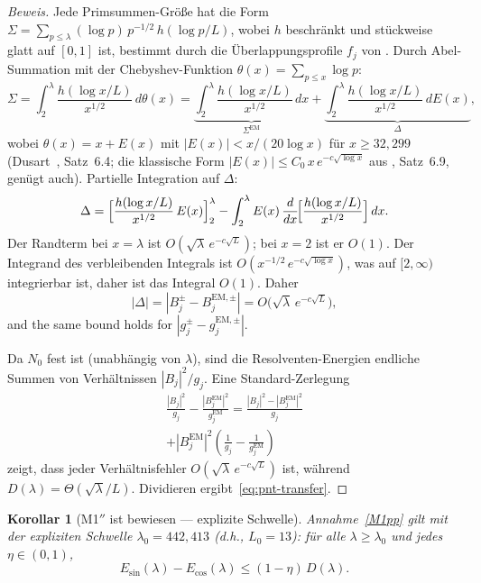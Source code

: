 \documentclass[12pt,a4paper]{article}
\newtheorem{corollary}[theorem]{Korollar}
\theoremstyle{definition}
\theoremstyle{remark}
\begin{document}
\begin{proof}[Beweis]
Jede Primsummen-Größe hat die Form $\Sigma = \sum_{p \leq \lambda} (\log p)\,p^{-1/2}\,h(\log p/L)$, wobei $h$ beschränkt und stückweise glatt auf $[0,1]$ ist, bestimmt durch die Überlappungsprofile $f_j$ von . Durch Abel-Summation mit der Chebyshev-Funktion $\theta(x) = \sum_{p \leq x} \log p$:
\[
  \Sigma = \int_2^{\lambda} \frac{h(\log x/L)}{x^{1/2}}\,d\theta(x)
  = \underbrace{\int_2^{\lambda} \frac{h(\log x/L)}{x^{1/2}}\,dx}_{\Sigma^{\mathrm{EM}}}
  + \underbrace{\int_2^{\lambda} \frac{h(\log x/L)}{x^{1/2}}\,dE(x)}_{\Delta},
\]
wobei $\theta(x) = x + E(x)$ mit $|E(x)| < x/(20\log x)$ für $x \geq 32{,}299$ (Dusart~\cite{Dusart2010}, Satz~6.4; die klassische Form $|E(x)| \leq C_0\,x\,e^{-c\sqrt{\log x}}$ aus \cite{IwaniecKowalski2004}, Satz~6.9, genügt auch). Partielle Integration auf $\Delta$:
\[
  \Delta = \Bigl[\frac{h(\log x/L)}{x^{1/2}}\,E(x)\Bigr]_2^{\lambda}
  - \int_2^{\lambda} E(x)\,\frac{d}{dx}\!\Bigl[\frac{h(\log x/L)}{x^{1/2}}\Bigr]\,dx.
\]
Der Randterm bei $x = \lambda$ ist $O(\sqrt{\lambda}\,e^{-c\sqrt{L}})$; bei $x = 2$ ist er $O(1)$. Der Integrand des verbleibenden Integrals ist $O(x^{-1/2}\,e^{-c\sqrt{\log x}})$, was auf $[2,\infty)$ integrierbar ist, daher ist das Integral $O(1)$. Daher
\begin{equation}
\label{eq:pnt-error}
  |\Delta| = |B_j^{\pm} - B_j^{\mathrm{EM},\pm}| = O\!\bigl(\sqrt{\lambda}\,e^{-c\sqrt{L}}\bigr),
\end{equation}
and the same bound holds for $|g_j^{\pm} - g_j^{\mathrm{EM},\pm}|$.

Da $N_0$ fest ist (unabhängig von $\lambda$), sind die Resolventen-Energien endliche Summen von Verhältnissen $|B_j|^2/g_j$. Eine Standard-Zerlegung
\begin{multline*}
  \frac{|B_j|^2}{g_j} - \frac{|B_j^{\mathrm{EM}}|^2}{g_j^{\mathrm{EM}}}
  = \frac{|B_j|^2 - |B_j^{\mathrm{EM}}|^2}{g_j} \\
  + |B_j^{\mathrm{EM}}|^2\!\left(\frac{1}{g_j} - \frac{1}{g_j^{\mathrm{EM}}}\right)
\end{multline*}
zeigt, dass jeder Verhältnisfehler $O(\sqrt{\lambda}\,e^{-c\sqrt{L}})$ ist, während $D(\lambda) = \Theta(\sqrt{\lambda}/L)$. Dividieren ergibt~\eqref{eq:pnt-transfer}.
\end{proof}

\begin{corollary}[M1$''$ ist bewiesen --- explizite Schwelle]
\label{cor:M1-proved}
Annahme~\ref{M1pp} gilt mit der expliziten Schwelle $\lambda_0 = 442{,}413$ (d.h., $L_0 = 13$): für alle $\lambda \geq \lambda_0$ und jedes $\eta \in (0,1)$,
\[
  E_{\sin}(\lambda) - E_{\cos}(\lambda) \leq (1-\eta)\,D(\lambda).
\]
\end{corollary}
\end{document}
